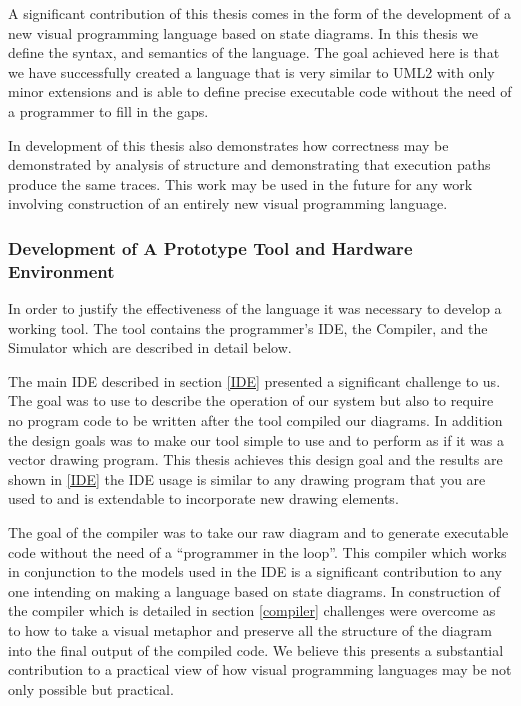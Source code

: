 A significant contribution of this thesis comes in the form of the development of \plccharts a new visual programming language based on state diagrams. In this thesis we define the syntax, and semantics of the language. The goal achieved here is that we have successfully created a language that is very similar to UML2 with only minor extensions and is able to define precise executable code without the need of a programmer to fill in the gaps.

In development of \plccharts this thesis also demonstrates how correctness may be demonstrated by analysis of structure and demonstrating that execution paths produce the same traces. This work may be used in the future for any work involving construction of an entirely new visual programming language.


\subsubsection{Development of A Prototype Tool and Hardware Environment}
In order to justify the effectiveness of the \plccharts language it was necessary to develop a working tool. The tool contains the programmer's IDE, the Compiler, and the Simulator which are described in detail below.

The main IDE described in section \ref{IDE} presented a significant challenge to us. The goal was to use \plccharts to describe the operation of our system but also to require no program code to be written after the tool compiled our diagrams. In addition the design goals was to make our tool simple to use and to perform as if it was a vector drawing program. This thesis achieves this design goal and the results are shown in \ref{IDE} the IDE usage is similar to any drawing program that you are used to and is extendable to incorporate new drawing elements.

The goal of the compiler was to take our raw diagram and to generate executable code without the need of a ``programmer in the loop''. This compiler which works in conjunction to the models used in the IDE is a significant contribution to any one intending on making a language based on state diagrams. In construction of the compiler which is detailed in section \ref{compiler} challenges were overcome as to how to take a visual metaphor and preserve all the structure of the diagram into the final output of the compiled code. We believe this presents a substantial contribution to a practical view of how visual programming languages may be not only possible but practical.

